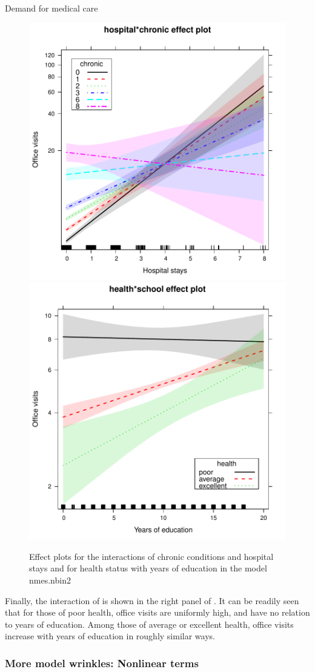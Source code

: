 \documentclass[11pt]{book}\usepackage[]{graphicx}\usepackage[]{color}
\newenvironment{knitrout}{}{} %
\renewenvironment{knitrout}{\small\renewcommand{\baselinestretch}{.85}}{} %
\begin{document}
\begin{Example}[nmes2a]{Demand for medical care}
\begin{knitrout}
\begin{figure}[!htbp]
\centerline{\includegraphics[width=.49\textwidth]{ch09/fig/nmes2-eff41} 
\includegraphics[width=.49\textwidth]{ch09/fig/nmes2-eff42} }

\caption[Effect plots for the interactions of chronic conditions and hospital stays and for health status with years of education in the model nmes]{Effect plots for the interactions of chronic conditions and hospital stays and for health status with years of education in the model nmes.nbin2\label{fig:nmes2-eff4}}
\end{figure}


\end{knitrout}

Finally, the interaction of  is shown in the right panel of 
. It
can be readily seen that for those of poor health, office visits are
uniformly high, and have no relation to years of education. Among
those of average or excellent health, office visits increase with years
of education in roughly similar ways.
\end{Example}

\subsubsection{More model wrinkles: Nonlinear terms}
\end{document}
